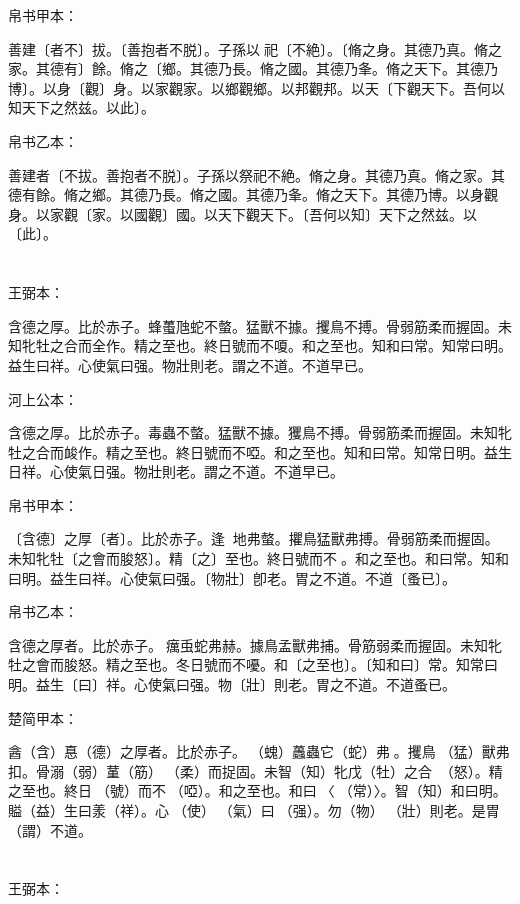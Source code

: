 \documentclass[a5paper]{ctexbook}
\begin{document}
    帛书甲本：

    善建〔者不〕拔。〔善抱者不脱〕。子孫以󱁃祀〔不絶〕。〔脩之身。其德乃真。脩之家。其德有〕餘。脩之〔鄉。其德乃長。脩之國。其德乃夆。脩之天下。其德乃博〕。以身〔觀〕身。以家觀家。以鄉觀鄉。以邦觀邦。以天〔下觀天下。吾何以知天下之然兹。以此〕。

    帛书乙本：

    善建者〔不拔。善抱者不脱〕。子孫以祭祀不絶。脩之身。其德乃真。脩之家。其德有餘。脩之鄉。其德乃長。脩之國。其德乃夆。脩之天下。其德乃博。以身觀身。以家觀〔家。以國觀〕國。以天下觀天下。〔吾何以知〕天下之然兹。以〔此〕。

    \chapter{}
    王弼本：

    含德之厚。比於赤子。蜂蠆虺蛇不螫。猛獸不據。攫鳥不搏。骨弱筋柔而握固。未知牝牡之合而全作。精之至也。終日號而不嗄。和之至也。知和曰常。知常曰明。益生曰祥。心使氣曰强。物壯則老。謂之不道。不道早已。

    河上公本：

    含德之厚。比於赤子。毒蟲不螫。猛獸不據。玃鳥不搏。骨弱筋柔而握固。未知牝牡之合而䘒作。精之至也。終日號而不啞。和之至也。知和曰常。知常日明。益生日祥。心使氣日强。物壯則老。謂之不道。不道早已。

    帛书甲本：

    〔含德〕之厚〔者〕。比於赤子。逢𢔯𧍥地弗螫。㩴鳥猛獸弗搏。骨弱筋柔而握固。未知牝牡〔之會而朘怒〕。精〔之〕至也。終日號而不𢖻。和之至也。和曰常。知和曰明。益生曰祥。心使氣曰强。〔物壯〕卽老。胃之不道。不道〔蚤已〕。

    帛书乙本：

    含德之厚者。比於赤子。𧒒癘䖝蛇弗赫。據鳥孟獸弗捕。骨筋弱柔而握固。未知牝牡之會而朘怒。精之至也。冬日號而不嚘。和〔之至也〕。〔知和曰〕常。知常曰明。益生〔曰〕祥。心使氣曰强。物〔壯〕則老。胃之不道。不道蚤已。

    楚简甲本：

    酓（含）惪（德）之厚者。比於赤子。󶵎（螝）䘍蟲它（蛇）弗𧍷。攫鳥󶵏（猛）獸弗扣。骨溺（弱）蓳（筋）󶵐（柔）而捉固。未智（知）牝戊（牡）之合󶵑󶵒（怒）。精之至也。終日󶴋（號）而不𪬐（啞）。和之至也。和曰󶵓〈󼲗（常）〉。智（知）和曰明。賹（益）生曰羕（祥）。心󶴎（使）󶴓（氣）曰󶴔（强）。勿（物）𡒉（壯）則老。是胃（謂）不道。

    \chapter{}
    王弼本：
\end{document}
